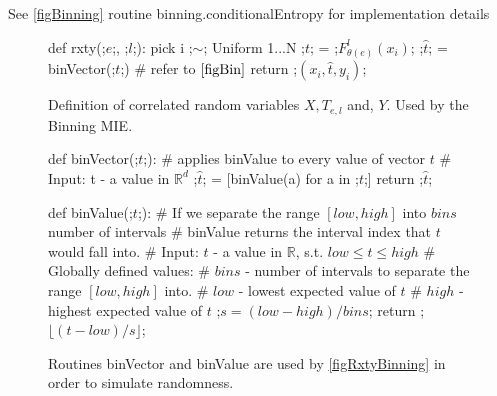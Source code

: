 \documentclass[dissertation.tex]{subfiles}
\begin{document}
See \autoref{figBinning} routine binning.conditionalEntropy for implementation
details

\begin{figure}[H]
    \begin{pythonfigure}
      def rxty(;$e$;, ;$l$;):
        pick i ;$\sim$; Uniform {1...N}
        ;$t$; = ;$F_{\theta(e)}^l(x_i)$;
        ;$\hat{t}$; = binVector(;$t$;) # refer to $\autoref{figBin}$
        return ;$(x_i, \hat{t}, y_i)$;
    \end{pythonfigure}
    \caption{
      Definition of correlated random variables $X, T_{e,l}$ and, $Y$. Used by
      the Binning MIE.
    }
    \label{figRxtyBinning}
\end{figure}

\begin{figure}[H]
    \begin{pythonfigure}
      def binVector(;$t$;): 
        # applies binValue to every value of vector $t$
        # Input: t - a value in $\mathbb{R}^d$
        ;$\hat{t}$; = [binValue(a) for a in ;$t$;]
        return ;$\hat{t}$;

      def binValue(;$t$;):
        # If we separate the range $[low, high]$ into $bins$ number of intervals 
        # binValue returns the interval index that $t$ would fall into.
        # Input: $t$ - a value in $\mathbb{R}$, s.t. $low\leq{t}\leq{high}$
        # Globally defined values:
        # $bins$  - number of intervals to separate the range $[low, high]$ into.
        # $low$   - lowest  expected value of $t$
        # $high$  - highest expected value of $t$
        ;$s = (low - high) / bins$;
        return ;$\lfloor{(t - low)/s}\rfloor$;
    \end{pythonfigure}
    \caption{
      Routines binVector and binValue are used by \autoref{figRxtyBinning}
      in order to simulate randomness.
    }
    \label{figBin}
\end{figure}

\newpage
\end{document}
